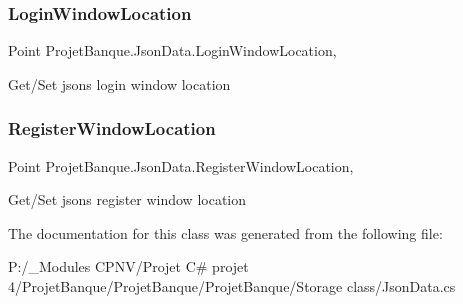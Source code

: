 \subsubsection{\texorpdfstring{LoginWindowLocation}{LoginWindowLocation}}
{\footnotesize\ttfamily Point Projet\+Banque.\+Json\+Data.\+Login\+Window\+Location\hspace{0.3cm}{\ttfamily [get]}, {\ttfamily [set]}}



Get/\+Set json\textquotesingle{}s login window location 

\mbox{\label{class_projet_banque_1_1_json_data_ae2055a1365e1c285dfcbf4b5c4b28375}} 
\subsubsection{\texorpdfstring{RegisterWindowLocation}{RegisterWindowLocation}}
{\footnotesize\ttfamily Point Projet\+Banque.\+Json\+Data.\+Register\+Window\+Location\hspace{0.3cm}{\ttfamily [get]}, {\ttfamily [set]}}



Get/\+Set json\textquotesingle{}s register window location 



The documentation for this class was generated from the following file\+:\begin{DoxyCompactItemize}
\item 
P\+:/\+\_\+\+Modules C\+P\+N\+V/\+Projet C\# projet 4/\+Projet\+Banque/\+Projet\+Banque/\+Projet\+Banque/\+Storage class/Json\+Data.\+cs\end{DoxyCompactItemize}
